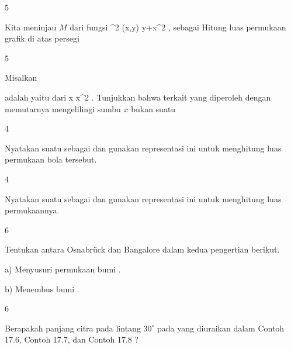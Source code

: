 {5}
{

Kita meninjau
$M$ dari fungsi
\maabbeledisp {\psi} {\R^2} {\R
} {(x,y)} { y+x^2
} {,}
sebagai
Hitung luas permukaan grafik di atas persegi

}
{} {}

{5}
{

Misalkan

 {  }

adalah
yaitu
dari
\maabbeledisp {} {\R} {\R
} { x } { x^2
} {.}
Tunjukkan bahwa
terkait yang diperoleh dengan memutarnya mengelilingi sumbu $x$ bukan suatu

}
{} {}

{4}
{

Nyatakan suatu
 sebagai
 dan gunakan representasi ini untuk menghitung luas permukaan bola tersebut.

}
{} {}

{4}
{

Nyatakan suatu
 sebagai
 dan gunakan representasi ini untuk menghitung luas permukaannya.

}
{} {}

{6}
{

Tentukan  antara Osnabrück dan Bangalore
 {} {}
dalam kedua pengertian berikut.

a) Menyusuri permukaan bumi
 {} {.}

b) Menembus bumi
 {} {.}

}
{} {}

{6}
{

Berapakah panjang citra
 pada lintang $30^\circ$
pada
yang diuraikan dalam
Contoh 17.6,
Contoh 17.7,
dan
Contoh 17.8
 {} {?}

}
{} {}
